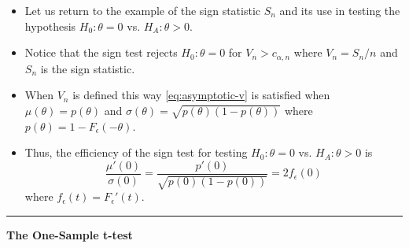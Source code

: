 \documentclass[]{book}
\begin{document}
\begin{itemize}
\item
  Let us return to the example of the sign statistic \(S_{n}\) and its use
  in testing the hypothesis \(H_{0}: \theta = 0\) vs. \(H_{A}: \theta > 0\).
\item
  Notice that the sign test rejects \(H_{0}:\theta=0\) for \(V_{n} > c_{\alpha,n}\)
  where \(V_{n} = S_{n}/n\) and \(S_{n}\) is the sign statistic.
\item
  When \(V_{n}\) is defined this way \eqref{eq:asymptotic-v} is satisfied
  when \(\mu(\theta) = p(\theta)\) and \(\sigma(\theta) = \sqrt{p(\theta)(1 - p(\theta) )}\)
  where \(p(\theta) = 1 - F_{\epsilon}( -\theta )\).
\item
  Thus, the efficiency of the sign test for testing \(H_{0}: \theta = 0\) vs. \(H_{A}: \theta > 0\) is
  \begin{equation}
  \frac{\mu'(0)}{\sigma(0)} = \frac{p'(0)}{\sqrt{p(0)(1 - p(0))}} = 2f_{\epsilon}(0)
  \end{equation}
  where \(f_{\epsilon}(t) = F_{\epsilon}'(t)\).
\end{itemize}

\begin{center}\rule{0.5\linewidth}{\linethickness}\end{center}

\textbf{The One-Sample t-test}
\end{document}
